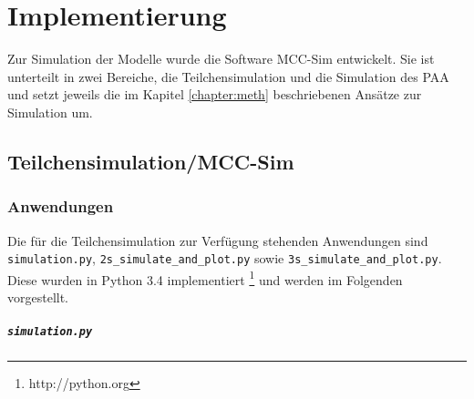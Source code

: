 \chapter{Implementierung}
\label{chapter:imp}

Zur Simulation der Modelle wurde die Software MCC-Sim entwickelt. 
Sie ist unterteilt in zwei Bereiche, die Teilchensimulation und die Simulation des PAA und setzt jeweils die im Kapitel \ref{chapter:meth} beschriebenen Ansätze zur Simulation um.
% 
% 


\section{Teilchensimulation/MCC-Sim}


\subsection{Anwendungen}
Die für die Teilchensimulation zur Verfügung stehenden Anwendungen sind \texttt{simulation.py}, \verb!2s_simulate_and_plot.py! sowie  \verb!3s_simulate_and_plot.py!. Diese wurden in Python 3.4 implementiert \footnote{http://python.org} und werden im Folgenden vorgestellt.

\paragraph{\texttt{simulation.py}}


